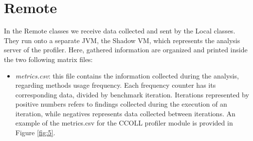 \documentclass[]{usiinfthesis}
\begin{document}
\section{Remote} \label{sec:5.6}
In the Remote classes we receive data collected and sent by the Local classes. They run onto a separate JVM, the Shadow VM, which represents the analysis server of the profiler. Here, gathered information are organized and printed inside the two following matrix files:

\begin{itemize}
    \item \textit{metrics.csv}: this file contains the information collected during the analysis, regarding methods usage frequency. Each frequency counter has its corresponding data, divided by benchmark iteration. Iterations represented by positive numbers refers to findings collected during the execution of an iteration, while negatives represents data collected between iterations. An example of the metrics.csv for the CCOLL profiler module is provided in Figure \ref{fig:5}.
    

\end{itemize}
\end{document}
